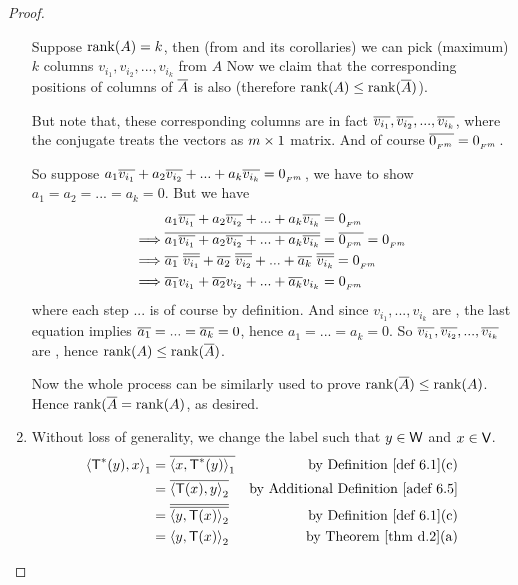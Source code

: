 \begin{proof}
\begin{enumerate}
Suppose \(\mathrm{rank}(A) = k\), then (from  and its corollaries) we can pick \LID{} (maximum) \(k\) columns \(v_{i_1}, v_{i_2}, ..., v_{i_k}\) from \(A\)
Now we claim that the corresponding positions of columns of \(\overline{A}\) is also \LID{} (therefore \(\mathrm{rank}(A) \le \mathrm{rank}(\overline{A})\)).

But note that, these corresponding columns are in fact
\(\overline{v_{i_1}}, \overline{v_{i_2}}, ..., \overline{v_{i_k}}\), where the conjugate treats the vectors as \(m \times 1\) matrix.
And of course \(\overline{0_{_{F^m}}} = 0_{_{F^m}}\).

So suppose \(a_1 \overline{v_{i_1}} + a_2 \overline{v_{i_2}} + ... + a_k \overline{v_{i_k}} = 0_{_{F^m}}\), we have to show \(a_1 = a_2 = ... = a_k = 0\).
But we have
\begin{align*}
        & a_1 \overline{v_{i_1}} + a_2 \overline{v_{i_2}} + ... + a_k \overline{v_{i_k}} = 0_{_{F^m}} \\
    \implies & \overline{a_1 \overline{v_{i_1}} + a_2 \overline{v_{i_2}} + ... + a_k \overline{v_{i_k}}} = \overline{0_{_{F^m}}} = 0_{_{F^m}} \\
    \implies & \overline{a_1} \  \overline{\overline{v_{i_1}}}
        + \overline{a_2} \  \overline{\overline{v_{i_2}}}
        + ...
        + \overline{a_k} \ \overline{\overline{v_{i_k}}} = 0_{_{F^m}} \\
    \implies & \overline{a_1} v_{i_1}
        + \overline{a_2} v_{i_2}
        + ...
        + \overline{a_k} v_{i_k} = 0_{_{F^m}}
\end{align*}
where each step ... is of course by definition.
And since \(v_{i_1}, ..., v_{i_k}\) are \LID{}, the last equation implies \(\overline{a_1} = ... = \overline{a_k} = 0\), hence \(a_1 = ... = a_k = 0\).
So \(\overline{v_{i_1}}, \overline{v_{i_2}}, ..., \overline{v_{i_k}}\) are \LID{}, hence \(\mathrm{rank}(A) \le \mathrm{rank}(\overline{A})\).

Now the whole process can be similarly used to prove \(\mathrm{rank}(\overline{A}) \le \mathrm{rank}(A)\).
Hence \(\mathrm{rank}(\overline{A} = \mathrm{rank}(A)\), as desired.

\item Without loss of generality, we change the label such that \(y \in \textsf{W}\) and \(x \in \textsf{V}\).
\begin{align*}
    \LG \T^*(y), x \RG_1
        & = \conjugatet{\LG x, \T^*(y) \RG_1} & \text{by \DEF{6.1}(c)} \\
        & = \conjugatet{\LG \T(x), y \RG_2} & \text{by \ADEF{6.5}} \\
        & = \conjugatet{\conjugatet{\LG y, \T(x) \RG_2}} & \text{by \DEF{6.1}(c)} \\
        & = \LG y, \T(x) \RG_2 & \text{by \THM{d.2}(a)}
\end{align*}


\end{enumerate}
\end{proof}
